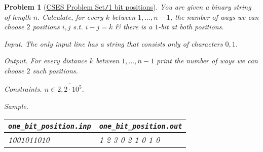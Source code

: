 \documentclass{article}
\newtheorem{problem}{Problem}
\begin{document}
\begin{problem}[\href{https://cses.fi/problemset/task/2112}{CSES Problem Set{\tt/}1 bit positions}]
    You are given a binary string of length $n$. Calculate, for every $k$ between $1,\ldots,n - 1$, the number of ways we can choose $2$ positions $i,j$ s.t. $i - j = k$ \& there is a $1$-bit at both positions.
    \item {\sf Input.} The only input line has a string that consists only of characters $0,1$.
    \item {\sf Output.} For every distance $k$ between $1,\ldots,n - 1$ print the number of ways we can choose $2$ such positions.
    \item {\sf Constraints.} $n\in\overline{2,2\cdot10^5}$.
    \item {\sf Sample.}
    \begin{table}[H]
        \centering
        \begin{tabular}{|l|l|}
            \hline
            \verb|one_bit_position.inp| & \verb|one_bit_position.out| \\
            \hline
            1001011010 & 1 2 3 0 2 1 0 1 0 \\
            \hline
        \end{tabular}
    \end{table}
\end{problem}
\end{document}
